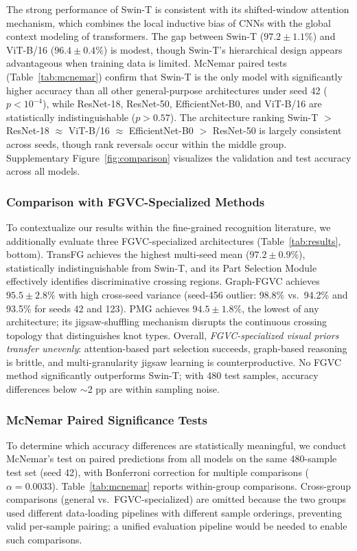 \documentclass[preprint,review,12pt]{elsarticle}
\begin{document}
The strong performance of Swin-T is consistent with its shifted-window attention mechanism, which combines the local inductive bias of CNNs with the global context modeling of transformers. The gap between Swin-T ($97.2 \pm 1.1\%$) and ViT-B/16 ($96.4 \pm 0.4\%$) is modest, though Swin-T's hierarchical design appears advantageous when training data is limited. McNemar paired tests (Table~\ref{tab:mcnemar}) confirm that Swin-T is the only model with significantly higher accuracy than all other general-purpose architectures under seed 42 ($p < 10^{-4}$), while ResNet-18, ResNet-50, EfficientNet-B0, and ViT-B/16 are statistically indistinguishable ($p > 0.57$). The architecture ranking Swin-T $>$ ResNet-18 $\approx$ ViT-B/16 $\approx$ EfficientNet-B0 $>$ ResNet-50 is largely consistent across seeds, though rank reversals occur within the middle group. Supplementary Figure~\ref{fig:comparison} visualizes the validation and test accuracy across all models.

\subsubsection{Comparison with FGVC-Specialized Methods}

To contextualize our results within the fine-grained recognition literature, we additionally evaluate three FGVC-specialized architectures (Table~\ref{tab:results}, bottom). TransFG achieves the highest multi-seed mean ($97.2 \pm 0.9\%$), statistically indistinguishable from Swin-T, and its Part Selection Module effectively identifies discriminative crossing regions. Graph-FGVC achieves $95.5 \pm 2.8\%$ with high cross-seed variance (seed-456 outlier: 98.8\% vs.\ 94.2\% and 93.5\% for seeds 42 and 123). PMG achieves $94.5 \pm 1.8\%$, the lowest of any architecture; its jigsaw-shuffling mechanism disrupts the continuous crossing topology that distinguishes knot types. Overall, \emph{FGVC-specialized visual priors transfer unevenly}: attention-based part selection succeeds, graph-based reasoning is brittle, and multi-granularity jigsaw learning is counterproductive. No FGVC method significantly outperforms Swin-T; with 480 test samples, accuracy differences below $\sim$2 pp are within sampling noise.

\subsubsection{McNemar Paired Significance Tests}
\label{sec:mcnemar}

To determine which accuracy differences are statistically meaningful, we conduct McNemar's test \citep{mcnemar1947} on paired predictions from all models on the same 480-sample test set (seed 42), with Bonferroni correction for multiple comparisons ($\alpha = 0.0033$). Table~\ref{tab:mcnemar} reports within-group comparisons. Cross-group comparisons (general vs.\ FGVC-specialized) are omitted because the two groups used different data-loading pipelines with different sample orderings, preventing valid per-sample pairing; a unified evaluation pipeline would be needed to enable such comparisons.
\end{document}
